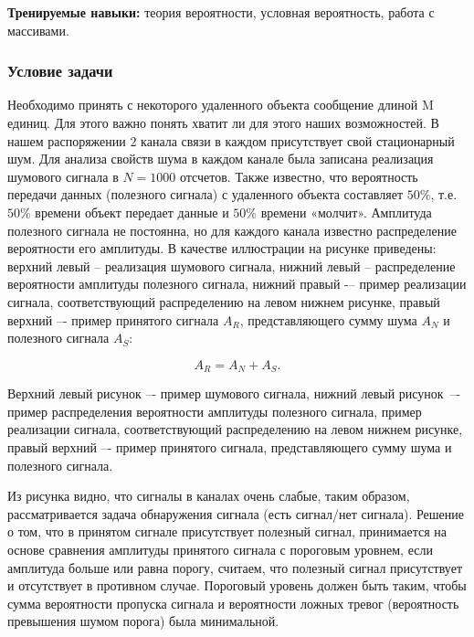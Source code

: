 
\textbf{Тренируемые навыки: }теория вероятности, условная вероятность, работа с массивами.

\subsubsection*{Условие задачи}

Необходимо принять с некоторого удаленного объекта сообщение длиной M единиц. Для этого важно понять хватит ли для этого наших возможностей. В нашем распоряжении 2 канала связи в каждом присутствует свой стационарный шум. Для анализа свойств шума в каждом канале была записана реализация шумового сигнала в $N = 1000$ отсчетов. Также известно, что вероятность передачи данных (полезного сигнала) с удаленного объекта составляет $50\%$, т.е. $50\%$ времени объект передает данные и $50\%$ времени «молчит». Амплитуда полезного сигнала не постоянна, но для каждого канала известно распределение вероятности его амплитуды. В качестве иллюстрации на рисунке приведены: верхний левый -- реализация шумового сигнала, нижний левый -- распределение вероятности амплитуды полезного сигнала, нижний правый -– пример реализации сигнала, соответствующий распределению на левом нижнем рисунке, правый верхний –- пример принятого сигнала $A_R$, представляющего сумму шума $A_N$ и полезного сигнала $A_S$:

$$A_R = A_N + A_S.$$


Верхний левый рисунок –- пример шумового сигнала, нижний левый рисунок~–- пример распределения вероятности амплитуды полезного сигнала, пример реализации сигнала, соответствующий распределению на левом нижнем рисунке, правый верхний –- пример принятого сигнала, представляющего сумму шума и полезного сигнала.

Из рисунка видно, что сигналы в каналах очень слабые, таким образом, рассматривается задача обнаружения сигнала (есть сигнал/нет сигнала). Решение о том, что в принятом сигнале присутствует полезный сигнал, принимается на основе сравнения амплитуды принятого сигнала с пороговым уровнем, если амплитуда больше или равна порогу, считаем, что полезный сигнал присутствует и отсутствует в противном случае. Пороговый уровень должен быть таким, чтобы сумма вероятности пропуска сигнала и вероятности ложных тревог (вероятность превышения шумом порога) была минимальной.

